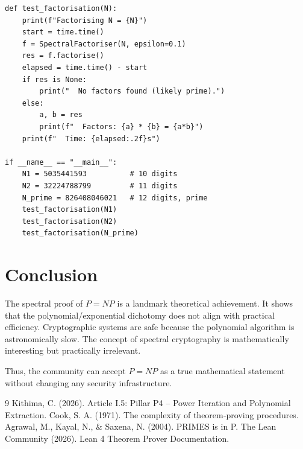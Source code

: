 \documentclass[11pt,a4paper]{article}
\begin{document}
\begin{lstlisting}[style=python, caption={SpectralFactoriser.py}]
def test_factorisation(N):
    print(f"Factorising N = {N}")
    start = time.time()
    f = SpectralFactoriser(N, epsilon=0.1)
    res = f.factorise()
    elapsed = time.time() - start
    if res is None:
        print("  No factors found (likely prime).")
    else:
        a, b = res
        print(f"  Factors: {a} * {b} = {a*b}")
    print(f"  Time: {elapsed:.2f}s")

if __name__ == "__main__":
    N1 = 5035441593          # 10 digits
    N2 = 32224788799         # 11 digits
    N_prime = 826408046021   # 12 digits, prime
    test_factorisation(N1)
    test_factorisation(N2)
    test_factorisation(N_prime)
\end{lstlisting}

\section{Conclusion}

The spectral proof of \(P = NP\) is a landmark theoretical achievement. It shows that the polynomial/exponential dichotomy does not align with practical efficiency. Cryptographic systems are safe because the polynomial algorithm is astronomically slow. The concept of spectral cryptography is mathematically interesting but practically irrelevant.

Thus, the community can accept \(P = NP\) as a true mathematical statement without changing any security infrastructure.


\begin{thebibliography}{9}
  Kithima, C. (2026). Article I.5: Pillar P4 – Power Iteration and Polynomial Extraction.
  Cook, S. A. (1971). The complexity of theorem‑proving procedures.
  Agrawal, M., Kayal, N., \& Saxena, N. (2004). PRIMES is in P.
  The Lean Community (2026). Lean 4 Theorem Prover Documentation.
\end{thebibliography}
\end{document}
